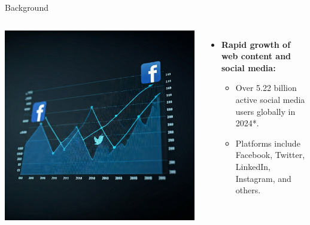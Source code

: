 \documentclass{beamer}
\begin{document}
    \begin{frame}{Background}
        \begin{columns}[T]
            \vspace{-0.25cm}
            \begin{center}
                \includegraphics[width=1.35\textwidth, keepaspectratio]{images/introduction_background_slide_image.jpeg}
            \end{center}

            \vspace{0.5cm}
            \begin{itemize}
                \item \textbf{Rapid growth of web content and social media:}
                \begin{itemize}
                    \item Over 5.22 billion active social media users globally in 2024\**.
                    \item Platforms include Facebook, Twitter, LinkedIn, Instagram, and others.
                \end{itemize}
            \end{itemize}
        \end{columns}


\end{frame}
\end{document}
